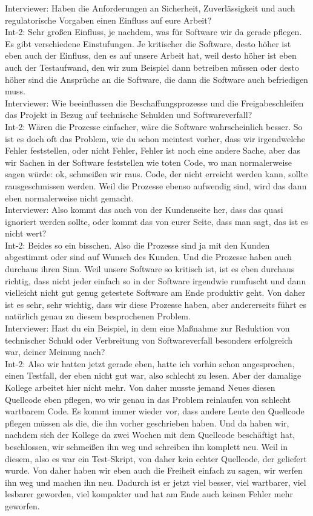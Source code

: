 Interviewer: Haben die Anforderungen an Sicherheit, Zuverlässigkeit und auch regulatorische Vorgaben einen Einfluss auf eure Arbeit?\\
Int-2: Sehr großen Einfluss, je nachdem, was für Software wir da gerade pflegen. Es gibt verschiedene Einstufungen. Je kritischer die Software, desto höher ist eben auch der Einfluss, den es auf unsere Arbeit hat, weil desto höher ist eben auch der Testaufwand, den wir zum Beispiel dann betreiben müssen oder desto höher sind die Ansprüche an die Software, die dann die Software auch befriedigen muss. \\
Interviewer: Wie beeinflussen die Beschaffungsprozesse und die Freigabeschleifen das Projekt in Bezug auf technische Schulden und Softwareverfall?\\
Int-2: Wären die Prozesse einfacher, wäre die Software wahrscheinlich besser. So ist es doch oft das Problem, wie du schon meintest vorher, dass wir irgendwelche Fehler feststellen, oder nicht Fehler, Fehler ist noch eine andere Sache, aber das wir Sachen in der Software feststellen wie toten Code, wo man normalerweise sagen würde: ok, schmeißen wir raus. Code, der nicht erreicht werden kann, sollte rausgeschmissen werden. Weil die Prozesse ebenso aufwendig sind, wird das dann eben normalerweise nicht gemacht. \\
Interviewer: Also kommt das auch von der Kundenseite her, dass das quasi ignoriert werden sollte, oder kommt das von eurer Seite, dass man sagt, das ist es nicht wert? \\
Int-2: Beides so ein bisschen. Also die Prozesse sind ja mit den Kunden abgestimmt oder sind auf Wunsch des Kunden. Und die Prozesse haben auch durchaus ihren Sinn. Weil unsere Software so kritisch ist, ist es eben durchaus richtig, dass nicht jeder einfach so in der Software irgendwie rumfuscht und dann vielleicht nicht gut genug getestete Software am Ende produktiv geht. Von daher ist es sehr, sehr wichtig, dass wir diese Prozesse haben, aber andererseits führt es natürlich genau zu diesem besprochenen Problem. \\
Interviewer: Hast du ein Beispiel, in dem eine Maßnahme zur Reduktion von technischer Schuld oder Verbreitung von Softwareverfall besonders erfolgreich war, deiner Meinung nach? \\
Int-2: Also wir hatten jetzt gerade eben, hatte ich vorhin schon angesprochen, einen Testfall, der eben nicht gut war, also schlecht zu lesen. Aber der damalige Kollege arbeitet hier nicht mehr. Von daher musste jemand Neues diesen Quellcode eben pflegen, wo wir genau in das Problem reinlaufen von schlecht wartbarem Code. Es kommt immer wieder vor, dass andere Leute den Quellcode pflegen müssen als die, die ihn vorher geschrieben haben. Und da haben wir, nachdem sich der Kollege da zwei Wochen mit dem Quellcode beschäftigt hat, beschlossen, wir schmeißen ihn weg und schreiben ihn komplett neu. Weil in diesem, also es war ein Test-Skript, von daher kein echter Quellcode, der geliefert wurde. Von daher haben wir eben auch die Freiheit einfach zu sagen, wir werfen ihn weg und machen ihn neu. Dadurch ist er jetzt viel besser, viel wartbarer, viel lesbarer geworden, viel kompakter und hat am Ende auch keinen Fehler mehr geworfen. \\

